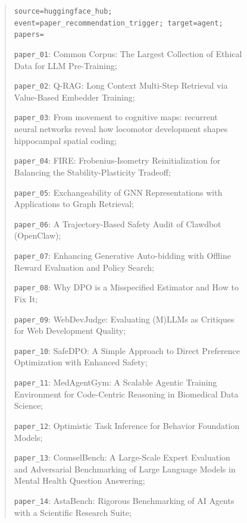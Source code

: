 \begin{figure}[h]
{    \vspace{3pt}
    \begin{quote}
    \tiny
    \setlength{\baselineskip}{6.2pt}
    \raggedright
    \texttt{source=huggingface\_hub; event=paper\_recommendation\_trigger; target=agent; papers=}\par
    \texttt{paper\_01}: Common Corpus: The Largest Collection of Ethical Data for LLM Pre-Training;\par
    \texttt{paper\_02}: Q-RAG: Long Context Multi-Step Retrieval via Value-Based Embedder Training;\par
    \texttt{paper\_03}: From movement to cognitive maps: recurrent neural networks reveal how locomotor development shapes hippocampal spatial coding;\par
    \texttt{paper\_04}: FIRE: Frobenius-Isometry Reinitialization for Balancing the Stability-Plasticity Tradeoff;\par
    \texttt{paper\_05}: Exchangeability of GNN Representations with Applications to Graph Retrieval;\par
    \texttt{paper\_06}: A Trajectory-Based Safety Audit of Clawdbot (OpenClaw);\par
    \texttt{paper\_07}: Enhancing Generative Auto-bidding with Offline Reward Evaluation and Policy Search;\par
    \texttt{paper\_08}: Why DPO is a Misspecified Estimator and How to Fix It;\par
    \texttt{paper\_09}: WebDevJudge: Evaluating (M)LLMs as Critiques for Web Development Quality;\par
    \texttt{paper\_10}: SafeDPO: A Simple Approach to Direct Preference Optimization with Enhanced Safety;\par
    \texttt{paper\_11}: MedAgentGym: A Scalable Agentic Training Environment for Code-Centric Reasoning in Biomedical Data Science;\par
    \texttt{paper\_12}: Optimistic Task Inference for Behavior Foundation Models;\par
    \texttt{paper\_13}: CounselBench: A Large-Scale Expert Evaluation and Adversarial Benchmarking of Large Language Models in Mental Health Question Answering;\par
    \texttt{paper\_14}: AstaBench: Rigorous Benchmarking of AI Agents with a Scientific Research Suite;\par

\end{quote}}
\end{figure}
